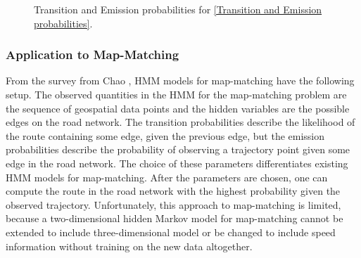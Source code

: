 \documentclass{article}
\numberwithin{equation}{section}
\theoremstyle{definition}
\begin{document}
\begin{figure}[h!]
    \centering
    \caption{Transition and Emission probabilities for \autoref{Transition and Emission probabilities}. }
    \label{TrEm}
\end{figure}








\subsubsection{Application to Map-Matching}

From the survey from Chao \cite{CXHZ}, HMM models for map-matching have the following setup. The observed quantities in the HMM for the map-matching problem are the sequence of geospatial data points and the hidden variables are the possible edges on the road network. The transition probabilities describe the likelihood of the route containing some edge, given the previous edge, but the emission probabilities describe the probability of observing a trajectory point given some edge in the road network. The choice of these parameters differentiates existing HMM models for map-matching. After the parameters are chosen, one can compute the route in the road network with the highest probability given the observed trajectory.
    Unfortunately, this approach to map-matching is limited, because a two-dimensional hidden Markov model for map-matching cannot be extended to include three-dimensional model or be changed to include speed information without training on the new data altogether. 
\end{document}
